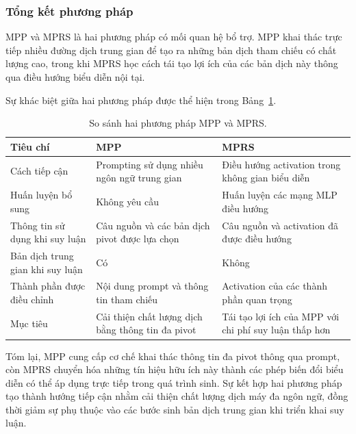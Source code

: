 \subsubsection*{Tổng kết phương pháp}

MPP và MPRS là hai phương pháp có mối quan hệ bổ trợ. MPP khai thác trực tiếp nhiều đường dịch trung gian để tạo ra những bản dịch tham chiếu có chất lượng cao, trong khi MPRS học cách tái tạo lợi ích của các bản dịch này thông qua điều hướng biểu diễn nội tại.

Sự khác biệt giữa hai phương pháp được thể hiện trong Bảng~\ref{tab:mpp-mprs-comparison}.

\begin{table}[ht]
	\centering
	\caption{So sánh hai phương pháp MPP và MPRS.}
	\label{tab:mpp-mprs-comparison}
	\begin{tabular}{|p{3.2cm}|p{5.1cm}|p{5.1cm}|}
		\hline
		\textbf{Tiêu chí} &
		\textbf{MPP} &
		\textbf{MPRS} \\
		\hline
		Cách tiếp cận &
		Prompting sử dụng nhiều ngôn ngữ trung gian &
		Điều hướng activation trong không gian biểu diễn \\
		\hline
		Huấn luyện bổ sung &
		Không yêu cầu &
		Huấn luyện các mạng MLP điều hướng \\
		\hline
		Thông tin sử dụng khi suy luận &
		Câu nguồn và các bản dịch pivot được lựa chọn &
		Câu nguồn và activation đã được điều hướng \\
		\hline
		Bản dịch trung gian khi suy luận &
		Có &
		Không \\
		\hline
		Thành phần được điều chỉnh &
		Nội dung prompt và thông tin tham chiếu &
		Activation của các thành phần quan trọng \\
		\hline
		Mục tiêu &
		Cải thiện chất lượng dịch bằng thông tin đa pivot &
		Tái tạo lợi ích của MPP với chi phí suy luận thấp hơn \\
		\hline
	\end{tabular}
\end{table}

Tóm lại, MPP cung cấp cơ chế khai thác thông tin đa pivot thông qua prompt, còn MPRS chuyển hóa những tín hiệu hữu ích này thành các phép biến đổi biểu diễn có thể áp dụng trực tiếp trong quá trình sinh. Sự kết hợp hai phương pháp tạo thành hướng tiếp cận nhằm cải thiện chất lượng dịch máy đa ngôn ngữ, đồng thời giảm sự phụ thuộc vào các bước sinh bản dịch trung gian khi triển khai suy luận.
